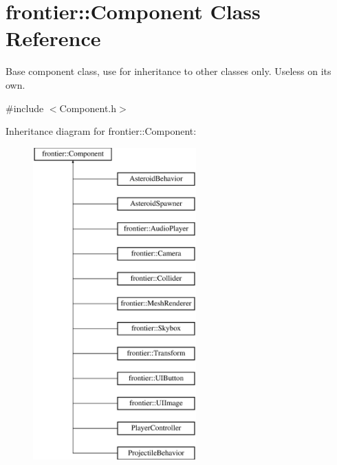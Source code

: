 \hypertarget{classfrontier_1_1_component}{}\section{frontier\+:\+:Component Class Reference}
\label{classfrontier_1_1_component}


Base component class, use for inheritance to other classes only. Useless on its own.  




{\ttfamily \#include $<$Component.\+h$>$}

Inheritance diagram for frontier\+:\+:Component\+:\begin{figure}[H]
\begin{center}
\leavevmode
\includegraphics[height=12.000000cm]{classfrontier_1_1_component}
\end{center}
\end{figure}
